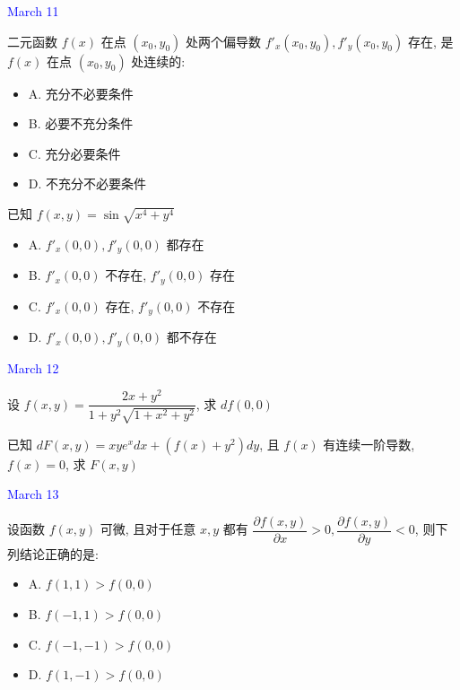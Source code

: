 \textcolor{blue}{March 11}

\begin{example}[][Exam: 29.2.7]
	二元函数 $f(x)$ 在点 $(x_{0},y_{0})$ 处两个偏导数 $f'_{x}(x_{0},y_{0}),f'_{y}(x_{0},y_{0})$ 存在, 是 $f(x)$ 在点 $(x_{0},y_{0})$ 处连续的:
\begin{itemize}
	\item A. 充分不必要条件
	\item B. 必要不充分条件
	\item C. 充分必要条件
	\item D. 不充分不必要条件
\end{itemize}
\end{example}

\begin{example}[][Exam: 29.2.8]
	已知 $f(x,y)=\sin\sqrt{x^{4}+y^{4}}$
\begin{itemize}
	\item A. $f'_{x}(0,0),f'_{y}(0,0)$ 都存在
	\item B. $f'_{x}(0,0)$ 不存在, $f'_{y}(0,0)$ 存在
	\item C. $f'_{x}(0,0)$ 存在, $f'_{y}(0,0)$ 不存在
	\item D. $f'_{x}(0,0),f'_{y}(0,0)$ 都不存在
\end{itemize}
\end{example}

\textcolor{blue}{March 12}

\begin{example}[][Exam: 29.2.9]
	设 $f(x,y)=\dfrac{2x+y^{2}}{1+y^{2}\sqrt{1+x^{2}+y^{2}}}$, 求 $d f(0,0)$
\end{example}

\begin{example}[][Exam: 29.2.10]
	已知 $dF(x,y)=xye^{x}dx+(f(x)+y^{2})dy$, 且 $f(x)$ 有连续一阶导数, $f(x)=0$, 求 $F(x,y)$
\end{example}

\textcolor{blue}{March 13}

\begin{example}[][Exam: 29.2.11]
	设函数 $f(x,y)$ 可微, 且对于任意 $x,y$ 都有 $\dfrac{\partial f(x,y)}{\partial x}>0,\dfrac{\partial f(x,y)}{\partial y}<0$, 则下列结论正确的是:
\begin{itemize}
	\item A. $f(1,1)>f(0,0)$
	\item B. $f(-1,1)>f(0,0)$
	\item C. $f(-1,-1)>f(0,0)$
	\item D. $f(1,-1)>f(0,0)$
\end{itemize}
\end{example}

